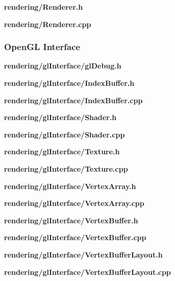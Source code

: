 \documentclass[../Main.tex]{subfiles}
\begin{document}
            \textbf{rendering/Renderer.h}
            
            \textbf{rendering/Renderer.cpp}
            

        \subsubsection{OpenGL Interface}
            \textbf{rendering/glInterface/glDebug.h}
            

            \textbf{rendering/glInterface/IndexBuffer.h}
            
            \textbf{rendering/glInterface/IndexBuffer.cpp}
            

            \textbf{rendering/glInterface/Shader.h}
            
            \textbf{rendering/glInterface/Shader.cpp}
            

            \textbf{rendering/glInterface/Texture.h}
            
            \textbf{rendering/glInterface/Texture.cpp}
            

            \textbf{rendering/glInterface/VertexArray.h}
            
            \textbf{rendering/glInterface/VertexArray.cpp}
            

            \textbf{rendering/glInterface/VertexBuffer.h}
            
            \textbf{rendering/glInterface/VertexBuffer.cpp}
            

            \textbf{rendering/glInterface/VertexBufferLayout.h}
            
            \textbf{rendering/glInterface/VertexBufferLayout.cpp}
            
\end{document}
